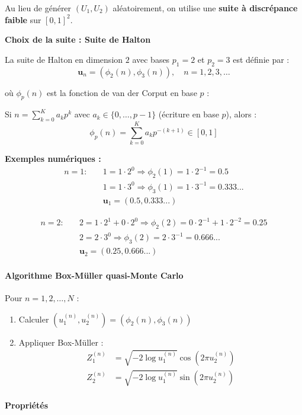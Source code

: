 \documentclass[12pt,a4paper]{article}
\theoremstyle{definition}
\theoremstyle{remark}
\begin{document}
Au lieu de générer $(U_1, U_2)$ aléatoirement, on utilise une \textbf{suite à discrépance faible} sur $[0,1]^2$.

\textbf{Choix de la suite : Suite de Halton}

La suite de Halton en dimension $2$ avec bases $p_1 = 2$ et $p_2 = 3$ est définie par :
\[
\mathbf{u}_n = (\phi_2(n), \phi_3(n)), \quad n = 1, 2, 3, \ldots
\]

où $\phi_p(n)$ est la fonction de van der Corput en base $p$ :

Si $n = \sum_{k=0}^K a_k p^k$ avec $a_k \in \{0, \ldots, p-1\}$ (écriture en base $p$), alors :
\[
\phi_p(n) = \sum_{k=0}^K a_k p^{-(k+1)} \in [0,1]
\]

\textbf{Exemples numériques :}
\begin{align*}
n = 1 : &\quad 1 = 1 \cdot 2^0 \Rightarrow \phi_2(1) = 1 \cdot 2^{-1} = 0.5 \\
&\quad 1 = 1 \cdot 3^0 \Rightarrow \phi_3(1) = 1 \cdot 3^{-1} = 0.333... \\
&\quad \mathbf{u}_1 = (0.5, 0.333...)
\end{align*}

\begin{align*}
n = 2 : &\quad 2 = 1 \cdot 2^1 + 0 \cdot 2^0 \Rightarrow \phi_2(2) = 0 \cdot 2^{-1} + 1 \cdot 2^{-2} = 0.25 \\
&\quad 2 = 2 \cdot 3^0 \Rightarrow \phi_3(2) = 2 \cdot 3^{-1} = 0.666... \\
&\quad \mathbf{u}_2 = (0.25, 0.666...)
\end{align*}

\paragraph{Algorithme Box-Müller quasi-Monte Carlo}

Pour $n = 1, 2, \ldots, N$ :
\begin{enumerate}
\item Calculer $(u_1^{(n)}, u_2^{(n)}) = (\phi_2(n), \phi_3(n))$

\item Appliquer Box-Müller :
\begin{align*}
Z_1^{(n)} &= \sqrt{-2\log u_1^{(n)}} \cos(2\pi u_2^{(n)}) \\
Z_2^{(n)} &= \sqrt{-2\log u_1^{(n)}} \sin(2\pi u_2^{(n)})
\end{align*}
\end{enumerate}

\paragraph{Propriétés}
\end{document}
